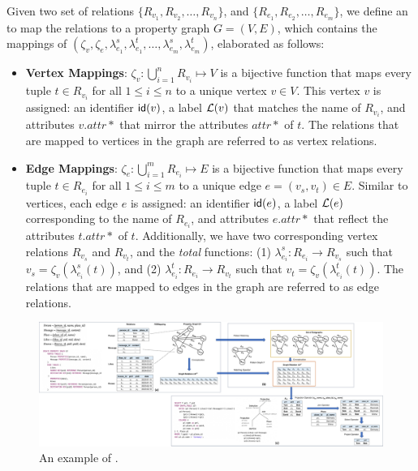 \begin{definition}[\rgmapping]
\label{def:rgmapping}
Given two set of relations $\{R_{v_1}, R_{v_2}, \ldots, R_{v_n}\}$, and $\{R_{e_1}, R_{e_2}, \ldots, R_{e_m}\}$, we define an \rgmapping to map the relations to a property graph $G = (V, E)$, which contains the mappings of $(\zeta_v, \zeta_e, \lambda_{e_1}^s, \lambda_{e_1}^t, \ldots, \lambda_{e_m}^s, \lambda_{e_m}^t)$, elaborated as follows:

\begin{itemize}
\item \textbf{Vertex Mappings}: $\zeta_v: \bigcup_{i=1}^{n} R_{v_i} \mapsto V$ is a bijective function that maps every tuple $t \in R_{v_i}$ for all $1 \leq i \leq n$ to a unique vertex $v \in V$. This vertex $v$ is assigned: an identifier ${\mathsf{id}}(v)$, a label $\mathcal{L}(v)$ that matches the name of $R_{v_i}$, and attributes $v.attr*$ that mirror the attributes $attr*$ of $t$.
The relations that are mapped to vertices in the graph are referred to as vertex relations.

\item \textbf{Edge Mappings}: $\zeta_e: \bigcup_{i=1}^{m} R_{e_i} \mapsto E$ is a bijective function that maps every tuple $t \in R_{e_i}$ for all $1 \leq i \leq m$ to a unique edge $e = (v_s, v_t) \in E$. Similar to vertices, each edge $e$ is assigned: an identifier ${\mathsf{id}}(e)$,
a label $\mathcal{L}(e)$ corresponding to the name of $R_{e_i}$, and attributes $e.attr*$ that reflect the attributes $t.attr*$ of $t$.
Additionally, we have two corresponding vertex relations $R_{v_s}$ and $R_{v_t}$, and the \emph{total} functions: (1) $\lambda_{e_i}^s: R_{e_i} \to R_{v_s}$ such that $v_s = \zeta_v(\lambda_{e_i}^s(t))$, and (2) $\lambda_{e_i}^t: R_{e_i} \to R_{v_t}$ such that $v_t = \zeta_v(\lambda_{e_i}^t(t))$. The relations that are mapped to edges in the graph are referred to as edge relations.
\end{itemize}
\end{definition}

\begin{figure}
    \centering
    \includegraphics[width=\linewidth]{./figures/rgmapping.pdf}
    \caption{An example of \rgmapping.}
    \label{fig:intro-rgmapping-example}
\end{figure}

